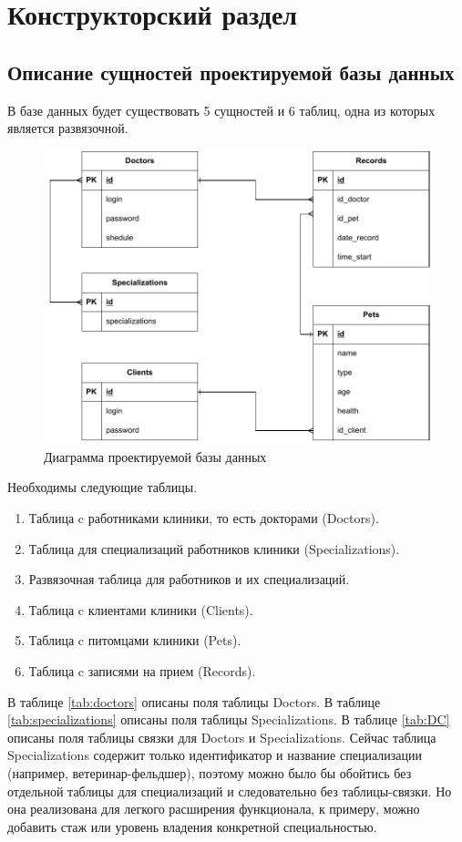 \section{Конструкторский раздел}

\subsection{Описание сущностей проектируемой базы данных}

В базе данных будет существовать 5 сущностей и 6 таблиц, одна из которых является развязочной. 
\begin{figure}[hbtp]
	\centering
	\includegraphics[width=150mm]{image/bd.pdf}
	\caption{Диаграмма проектируемой базы данных}
	\label{img:idef}
\end{figure}

Необходимы следующие таблицы.
\begin{enumerate}[label=\arabic*)]
	\item Таблица c работниками клиники, то есть докторами (Doctors).
	\item Таблица для специализаций работников клиники (Specializations).
	\item Развязочная таблица для работников и их специализаций.
	\item Таблица c клиентами клиники (Clients).
	\item Таблица c питомцами клиники (Pets).
	\item Таблица c записями на прием (Records).
\end{enumerate}

В таблице \ref{tab:doctors}  описаны поля таблицы Doctors. В таблице \ref{tab:specializations} описаны поля таблицы Specializations. В таблице \ref{tab:DC} описаны поля таблицы связки для Doctors и Specializations. Сейчас таблица Specializations содержит только идентификатор и название специализации (например, ветеринар-фельдшер), поэтому можно было бы обойтись без отдельной таблицы для специализаций и следовательно без таблицы-связки. Но она реализована для легкого расширения функционала, к примеру, можно добавить стаж или уровень владения конкретной специальностью.

